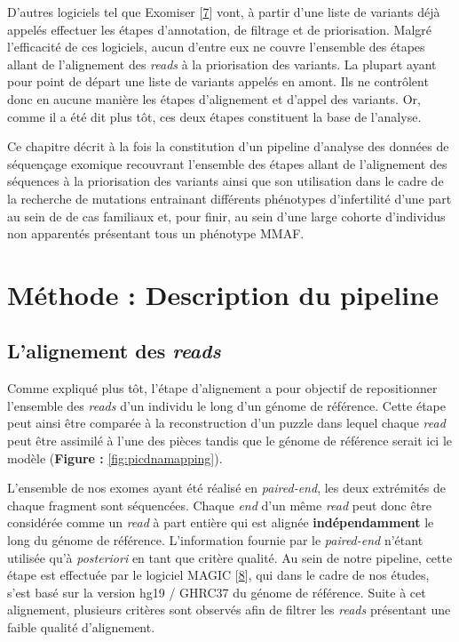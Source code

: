 \documentclass[12pt,twoside]{ugathesis}
\begin{document}
D'autres logiciels tel que Exomiser
{[}\protect\hyperlink{ref-Robinson2014}{7}{]} vont, à partir d'une liste
de variants déjà appelés effectuer les étapes d'annotation, de filtrage
et de priorisation. Malgré l'efficacité de ces logiciels, aucun d'entre
eux ne couvre l'ensemble des étapes allant de l'alignement des
\emph{reads} à la priorisation des variants. La plupart ayant pour point
de départ une liste de variants appelés en amont. Ils ne contrôlent donc
en aucune manière les étapes d'alignement et d'appel des variants. Or,
comme il a été dit plus tôt, ces deux étapes constituent la base de
l'analyse.

Ce chapitre décrit à la fois la constitution d'un pipeline d'analyse des
données de séquençage exomique recouvrant l'ensemble des étapes allant
de l'alignement des séquences à la priorisation des variants ainsi que
son utilisation dans le cadre de la recherche de mutations entrainant
différents phénotypes d'infertilité d'une part au sein de de cas
familiaux et, pour finir, au sein d'une large cohorte d'individus non
apparentés présentant tous un phénotype MMAF.

\newpage

\section{Méthode : Description du
pipeline}\label{methode-description-du-pipeline}

\subsection{\texorpdfstring{L'alignement des
\emph{reads}}{L'alignement des reads}}\label{lalignement-des-reads}

Comme expliqué plus tôt, l'étape d'alignement a pour objectif de
repositionner l'ensemble des \emph{reads} d'un individu le long d'un
génome de référence. Cette étape peut ainsi être comparée à la
reconstruction d'un puzzle dans lequel chaque \emph{read} peut être
assimilé à l'une des pièces tandis que le génome de référence serait ici
le modèle (\textbf{Figure : }\ref{fig:picdnamapping}).

L'ensemble de nos exomes ayant été réalisé en \emph{paired-end}, les
deux extrémités de chaque fragment sont séquencées. Chaque \emph{end}
d'un même \emph{read} peut donc être considérée comme un \emph{read} à
part entière qui est alignée \textbf{indépendamment} le long du génome
de référence. L'information fournie par le \emph{paired-end} n'étant
utilisée qu'à \emph{posteriori} en tant que critère qualité. Au sein de
notre pipeline, cette étape est effectuée par le logiciel MAGIC
{[}\protect\hyperlink{ref-Su2014}{8}{]}, qui dans le cadre de nos
études, s'est basé sur la version hg19 / GHRC37 du génome de référence.
Suite à cet alignement, plusieurs critères sont observés afin de filtrer
les \emph{reads} présentant une faible qualité d'alignement.
\end{document}
